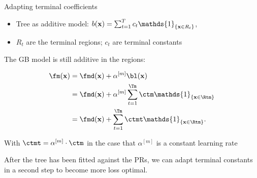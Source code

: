 \documentclass[11pt,compress,t,notes=noshow, xcolor=table]{beamer}
\begin{document}


\begin{vbframe}{Adapting terminal coefficients}

\begin{itemize}
\item Tree as additive model: $ b(\xv) = \sum_{t=1}^{T} c_t \mathds{1}_{\{\xv \in R_t\}} $,
\item $R_t$ are the terminal regions; $c_t$ are terminal constants 
\end{itemize}


\vspace*{0.2cm}

The GB model is still additive in the regions:

\begin{align*}
  \fm(\xv) &= \fmd(\xv) +  \alpha^{[m]} \bl(\xv) \\
         &= \fmd(\xv) +  \alpha^{[m]} \sum_{t=1}^{\Tm} \ctm \mathds{1}_{\{\xv \in \Rtm\}}\\
         &= \fmd(\xv) +  \sum_{t=1}^{\Tm} \ctmt \mathds{1}_{\{\xv \in \Rtm\}}.
\end{align*}

With $\ctmt = \alpha^{[m]} \cdot \ctm$ in the case that $\alpha^{[m]}$ is a constant learning rate


\framebreak
\begin{small}
After the tree has been fitted against the PRs, we can adapt terminal constants in a second step to become more loss optimal.


\end{small}
\end{vbframe}
\end{document}
